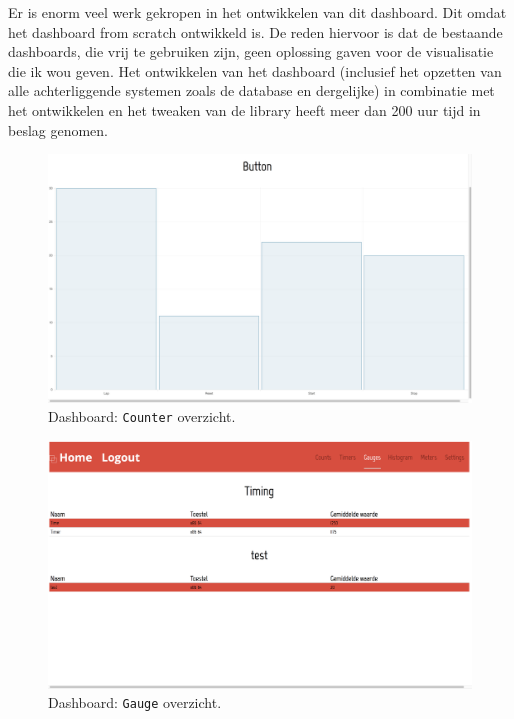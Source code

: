 Er is enorm veel werk gekropen in het ontwikkelen van dit dashboard. Dit omdat het dashboard from scratch ontwikkeld is. De reden hiervoor is dat de bestaande dashboards, die vrij te gebruiken zijn, geen oplossing gaven voor de visualisatie die ik wou geven. Het ontwikkelen van het dashboard (inclusief het opzetten van alle achterliggende systemen zoals de database en dergelijke) in combinatie met het ontwikkelen en het tweaken van de library heeft meer dan 200 uur tijd in beslag genomen.

\begin{figure}[!h]
  \centering
  \includegraphics[scale=0.2]{Afbeeldingen/Implementatie/Counter}
  \caption{Dashboard: \texttt{Counter} overzicht.}
  \label{fig:DasbhoardCounter}
\end{figure}

\begin{figure}[!h]
  \centering
  \includegraphics[scale=0.2]{Afbeeldingen/Implementatie/Gauge}
  \caption{Dashboard: \texttt{Gauge} overzicht.}
  \label{fig:DasbhoardGauge}
\end{figure}

